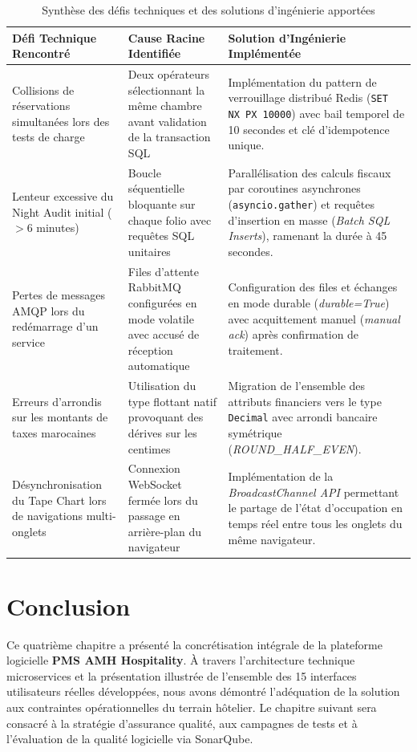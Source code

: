 \begin{table}[H]
\centering
\small
\renewcommand{\arraystretch}{1.3}
\begin{tabularx}{\textwidth}{|p{3.5cm}|p{3.8cm}|X|}
\hline
\textbf{Défi Technique Rencontré} & \textbf{Cause Racine Identifiée} & \textbf{Solution d'Ingénierie Implémentée} \\
\hline
Collisions de réservations simultanées lors des tests de charge & Deux opérateurs sélectionnant la même chambre avant validation de la transaction SQL & Implémentation du pattern de verrouillage distribué Redis (\texttt{SET NX PX 10000}) avec bail temporel de 10 secondes et clé d'idempotence unique. \\
\hline
Lenteur excessive du Night Audit initial ($> 6$ minutes) & Boucle séquentielle bloquante sur chaque folio avec requêtes SQL unitaires & Parallélisation des calculs fiscaux par coroutines asynchrones (\texttt{asyncio.gather}) et requêtes d'insertion en masse (\textit{Batch SQL Inserts}), ramenant la durée à 45 secondes. \\
\hline
Pertes de messages AMQP lors du redémarrage d'un service & Files d'attente RabbitMQ configurées en mode volatile avec accusé de réception automatique & Configuration des files et échanges en mode durable (\textit{durable=True}) avec acquittement manuel (\textit{manual ack}) après confirmation de traitement. \\
\hline
Erreurs d'arrondis sur les montants de taxes marocaines & Utilisation du type flottant natif provoquant des dérives sur les centimes & Migration de l'ensemble des attributs financiers vers le type \texttt{Decimal} avec arrondi bancaire symétrique (\textit{ROUND\_HALF\_EVEN}). \\
\hline
Désynchronisation du Tape Chart lors de navigations multi-onglets & Connexion WebSocket fermée lors du passage en arrière-plan du navigateur & Implémentation de la \textit{BroadcastChannel API} permettant le partage de l'état d'occupation en temps réel entre tous les onglets du même navigateur. \\
\hline
\end{tabularx}
\caption{Synthèse des défis techniques et des solutions d'ingénierie apportées}
\label{tab:defis_solutions}
\end{table}

\section{Conclusion}

Ce quatrième chapitre a présenté la concrétisation intégrale de la plateforme logicielle \textbf{PMS AMH Hospitality}. À travers l'architecture technique microservices et la présentation illustrée de l'ensemble des 15 interfaces utilisateurs réelles développées, nous avons démontré l'adéquation de la solution aux contraintes opérationnelles du terrain hôtelier. Le chapitre suivant sera consacré à la stratégie d'assurance qualité, aux campagnes de tests et à l'évaluation de la qualité logicielle via SonarQube.
